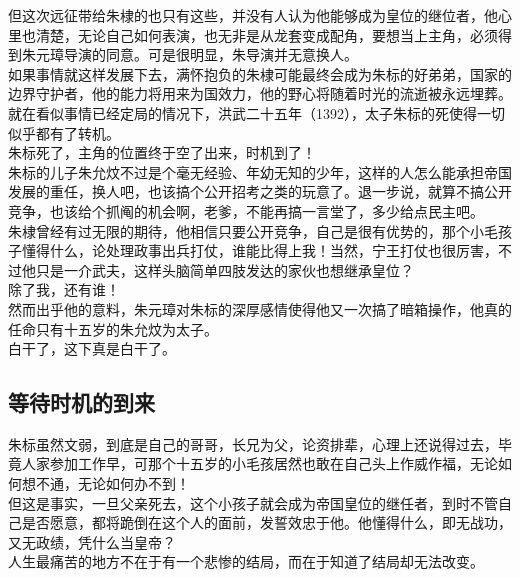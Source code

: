 \begin{multicols}{\theparacolNo}
但这次远征带给朱棣的也只有这些，并没有人认为他能够成为皇位的继位者，他心里也清楚，无论自己如何表演，也无非是从龙套变成配角，要想当上主角，必须得到朱元璋导演的同意。可是很明显，朱导演并无意换人。\\

如果事情就这样发展下去，满怀抱负的朱棣可能最终会成为朱标的好弟弟，国家的边界守护者，他的能力将用来为国效力，他的野心将随着时光的流逝被永远埋葬。\\

就在看似事情已经定局的情况下，洪武二十五年（1392），太子朱标的死使得一切似乎都有了转机。\\

朱标死了，主角的位置终于空了出来，时机到了！\\

朱标的儿子朱允炆不过是个毫无经验、年幼无知的少年，这样的人怎么能承担帝国发展的重任，换人吧，也该搞个公开招考之类的玩意了。退一步说，就算不搞公开竞争，也该给个抓阄的机会啊，老爹，不能再搞一言堂了，多少给点民主吧。\\

朱棣曾经有过无限的期待，他相信只要公开竞争，自己是很有优势的，那个小毛孩子懂得什么，论处理政事出兵打仗，谁能比得上我！当然，宁王打仗也很厉害，不过他只是一介武夫，这样头脑简单四肢发达的家伙也想继承皇位？\\

除了我，还有谁！\\

然而出乎他的意料，朱元璋对朱标的深厚感情使得他又一次搞了暗箱操作，他真的任命只有十五岁的朱允炆为太子。\\

白干了，这下真是白干了。\\

\subsection{等待时机的到来}
朱标虽然文弱，到底是自己的哥哥，长兄为父，论资排辈，心理上还说得过去，毕竟人家参加工作早，可那个十五岁的小毛孩居然也敢在自己头上作威作福，无论如何想不通，无论如何办不到！\\

但这是事实，一旦父亲死去，这个小孩子就会成为帝国皇位的继任者，到时不管自己是否愿意，都将跪倒在这个人的面前，发誓效忠于他。他懂得什么，即无战功，又无政绩，凭什么当皇帝？\\

人生最痛苦的地方不在于有一个悲惨的结局，而在于知道了结局却无法改变。\\


\end{multicols}
